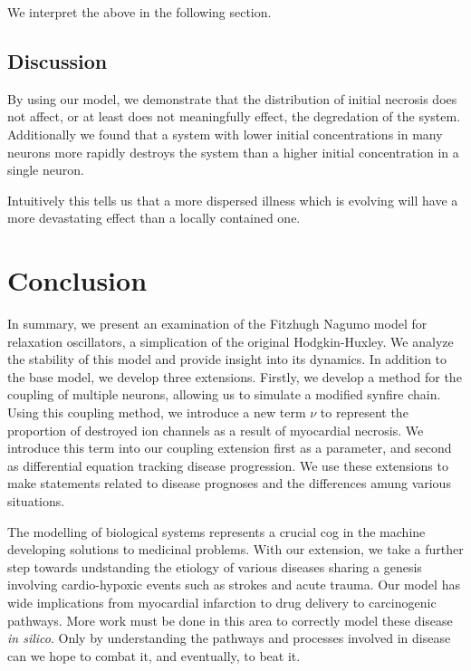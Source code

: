\documentclass[11pt]{report}
\begin{document}
We interpret the above in the following section.


\subsection{Discussion} %
\label{sub:discussion}


By using our model, we demonstrate that the distribution of initial necrosis does not affect, or at least does not meaningfully effect, the degredation of the system. Additionally we found that a system with lower initial concentrations in many neurons more rapidly destroys the system than a higher initial concentration in a single neuron. 

Intuitively this tells us that a more dispersed illness which is evolving will have a more devastating effect than a locally contained one. 

\section{Conclusion} %
\label{sec:conclusion}


In summary, we present an examination of the Fitzhugh Nagumo model for relaxation oscillators, a simplication of the original Hodgkin-Huxley. We analyze the stability of this model and provide insight into its dynamics. In addition to the base model, we develop three extensions. Firstly, we develop a method for the coupling of multiple  neurons, allowing us to simulate a modified synfire chain. Using this coupling method, we introduce a new term $\nu$ to represent the proportion of destroyed ion channels as a result of myocardial necrosis. We introduce this term into our coupling extension first as a parameter, and second as differential equation tracking disease progression. We use these extensions to make statements related to disease prognoses and the differences amung various situations. 

The modelling of biological systems represents a crucial cog in the machine developing solutions to medicinal problems. With our extension, we take a further step towards undstanding the etiology of various diseases sharing a genesis involving cardio-hypoxic events such as strokes and acute trauma. Our model has wide implications from myocardial infarction to drug delivery to carcinogenic pathways. More work must be done in this area to correctly model these disease \textit{in silico}. Only by understanding the pathways and processes involved in disease can we hope to combat it, and eventually, to beat it.  
\end{document}
